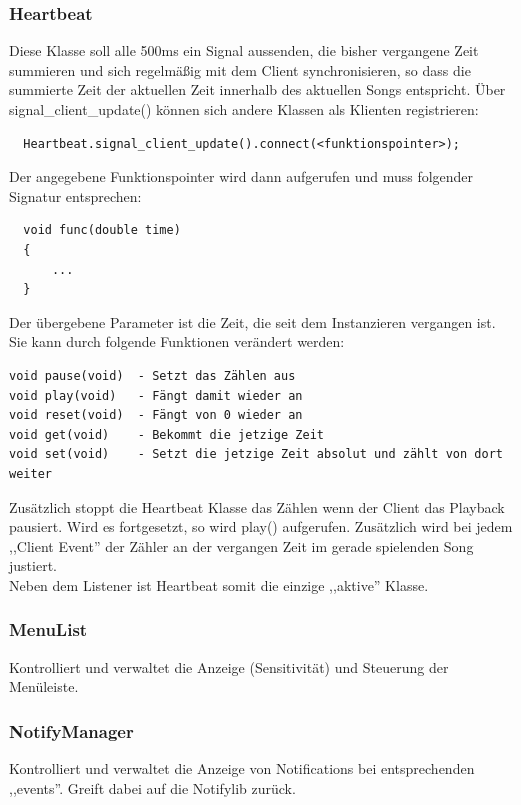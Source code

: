 \subsubsection{Heartbeat}
%
%
%
Diese Klasse soll alle 500ms ein Signal aussenden, die bisher vergangene Zeit summieren und sich regelmäßig mit dem 
Client synchronisieren, so dass die summierte Zeit der aktuellen Zeit innerhalb des aktuellen Songs entspricht.
Über signal\_client\_update() können sich andere Klassen als Klienten registrieren:
\begin{verbatim}
  Heartbeat.signal_client_update().connect(<funktionspointer>);
\end{verbatim}
Der angegebene Funktionspointer wird dann aufgerufen und muss folgender Signatur entsprechen:
\begin{verbatim}
  void func(double time)
  {
      ...
  }
\end{verbatim}

Der übergebene Parameter ist die Zeit, die seit dem Instanzieren vergangen ist. 
Sie kann durch folgende Funktionen verändert werden:
\begin{verbatim}
void pause(void)  - Setzt das Zählen aus
void play(void)   - Fängt damit wieder an
void reset(void)  - Fängt von 0 wieder an
void get(void)    - Bekommt die jetzige Zeit
void set(void)    - Setzt die jetzige Zeit absolut und zählt von dort weiter
\end{verbatim}

Zusätzlich stoppt die Heartbeat Klasse das Zählen wenn der Client das Playback pausiert.
Wird es fortgesetzt, so wird play() aufgerufen. 
Zusätzlich wird bei jedem ,,Client Event'' der Zähler an der vergangen Zeit im gerade spielenden Song justiert.
\\
Neben dem Listener ist Heartbeat somit die einzige ,,aktive'' Klasse.

\subsubsection{MenuList}
Kontrolliert und verwaltet die Anzeige (Sensitivität) und Steuerung der Menüleiste.

\subsubsection{NotifyManager}
Kontrolliert und verwaltet die Anzeige von Notifications bei entsprechenden ,,events''.
Greift dabei auf die Notifylib zurück.

